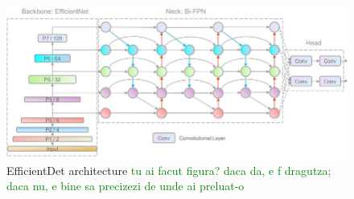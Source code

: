 \begin{figure}[!ht]
    \centering
    \includegraphics[width=1\textwidth]{figures/Figure7.jpg}
    \caption{EfficientDet architecture
    \textcolor{green}{tu ai facut figura? daca da, e f dragutza; daca nu, e bine sa precizezi de unde ai preluat-o}
    }
    \label{fig:fig7}
\end{figure}